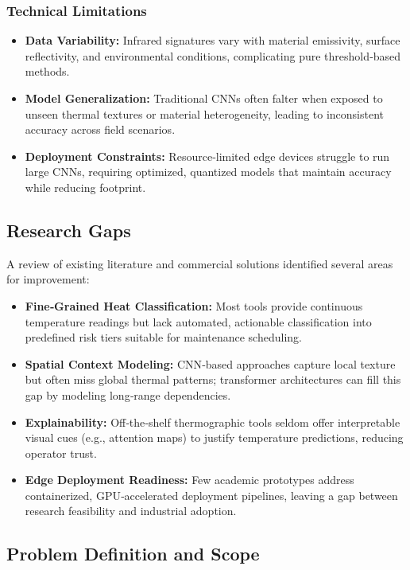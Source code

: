\subsubsection*{Technical Limitations}
\begin{itemize}
    \item \textbf{Data Variability:} Infrared signatures vary with material emissivity, surface reflectivity, and environmental conditions, complicating pure threshold‐based methods.
    \item \textbf{Model Generalization:} Traditional CNNs often falter when exposed to unseen thermal textures or material heterogeneity, leading to inconsistent accuracy across field scenarios.
    \item \textbf{Deployment Constraints:} Resource‐limited edge devices struggle to run large CNNs, requiring optimized, quantized models that maintain accuracy while reducing footprint.
\end{itemize}

\subsection{Research Gaps}
A review of existing literature and commercial solutions identified several areas for improvement:

\begin{itemize}
    \item \textbf{Fine‐Grained Heat Classification:} Most tools provide continuous temperature readings but lack automated, actionable classification into predefined risk tiers suitable for maintenance scheduling.
    \item \textbf{Spatial Context Modeling:} CNN‐based approaches capture local texture but often miss global thermal patterns; transformer architectures can fill this gap by modeling long‐range dependencies.
    \item \textbf{Explainability:} Off‐the‐shelf thermographic tools seldom offer interpretable visual cues (e.g., attention maps) to justify temperature predictions, reducing operator trust.
    \item \textbf{Edge Deployment Readiness:} Few academic prototypes address containerized, GPU‐accelerated deployment pipelines, leaving a gap between research feasibility and industrial adoption.
\end{itemize}

\subsection{Problem Definition and Scope}

